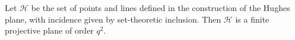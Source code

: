 Let $\mathcal{H}$ be the set of points and lines defined in the construction of the Hughes plane, with incidence given by set-theoretic inclusion. Then $\mathcal{H}$ is a finite projective plane of order $q^2$.

